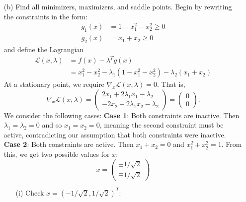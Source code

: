 \documentclass{article}
\begin{document}
\begin{itemize}
\begin{itemize}
        \item[(b)] Find all minimizers, maximizers, and saddle points.
        \newline\newline
        Begin by rewriting the constraints in the  form:
        \begin{align*}
            g_1(x) &= 1 - x_1^2 - x_2^2 \geq 0\\
            g_2(x) &= x_1 + x_2 \geq 0
        \end{align*}
        and define the Lagrangian 
        \begin{align*}
            \mathscr{L}(x,\lambda) &= f(x) - \lambda^Tg(x)\\
            &= x_1^2 - x_2^2 - \lambda_1(1 - x_1^2 - x_2^2) - \lambda_2(x_1 + x_2)
        \end{align*}
        At a stationary point, we require $\nabla_x\mathscr{L}(x,\lambda) = 0$. That is,
        \[\nabla_x\mathscr{L}(x,\lambda) = \begin{pmatrix}
            2x_1 + 2\lambda_1x_1 - \lambda_2\\
            -2x_2 + 2\lambda_1x_2 - \lambda_2
        \end{pmatrix} = \begin{pmatrix}
            0\\
            0
        \end{pmatrix}.\]
        We consider the following cases:
        \newline\newline
        \textbf{Case 1}: Both constraints are inactive. Then $\lambda_1 = \lambda_2 = 0$ and so $x_1 = x_2 = 0$, meaning the second constraint must be active, contradicting our assumption that both constraints were inactive.
        \newline\newline
        \textbf{Case 2}: Both constraints are active.
        \newline
        Then $x_1 + x_2 = 0$ and $x_1^2 + x_2^2 = 1$. From this, we get two possible values for $x$:
        \[x = \begin{pmatrix}
            \pm 1/\sqrt{2}\\
            \mp 1/\sqrt{2}
        \end{pmatrix}\]
        \begin{itemize}
            \item[(i)] Check $x = (-1/\sqrt{2}, 1/\sqrt{2})^T$:
            \newline

\end{itemize}
\end{itemize}
\end{itemize}
\end{document}
